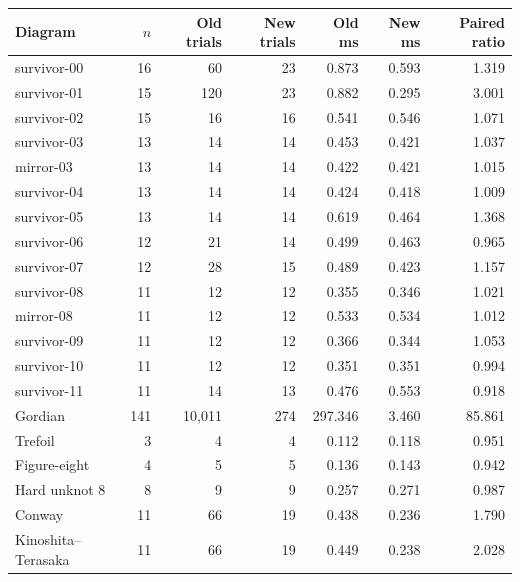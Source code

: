 \begingroup\small\setlength{\LTpre}{6pt}\setlength{\LTpost}{6pt}
\begin{longtable}{@{}lrrrrrr@{}}
\toprule Diagram & $n$ & Old trials & New trials & Old ms & New ms & Paired ratio\\\midrule\endhead
survivor-00 & 16 & 60 & 23 & 0.873 & 0.593 & 1.319\\
survivor-01 & 15 & 120 & 23 & 0.882 & 0.295 & 3.001\\
survivor-02 & 15 & 16 & 16 & 0.541 & 0.546 & 1.071\\
survivor-03 & 13 & 14 & 14 & 0.453 & 0.421 & 1.037\\
mirror-03 & 13 & 14 & 14 & 0.422 & 0.421 & 1.015\\
survivor-04 & 13 & 14 & 14 & 0.424 & 0.418 & 1.009\\
survivor-05 & 13 & 14 & 14 & 0.619 & 0.464 & 1.368\\
survivor-06 & 12 & 21 & 14 & 0.499 & 0.463 & 0.965\\
survivor-07 & 12 & 28 & 15 & 0.489 & 0.423 & 1.157\\
survivor-08 & 11 & 12 & 12 & 0.355 & 0.346 & 1.021\\
mirror-08 & 11 & 12 & 12 & 0.533 & 0.534 & 1.012\\
survivor-09 & 11 & 12 & 12 & 0.366 & 0.344 & 1.053\\
survivor-10 & 11 & 12 & 12 & 0.351 & 0.351 & 0.994\\
survivor-11 & 11 & 14 & 13 & 0.476 & 0.553 & 0.918\\
Gordian & 141 & 10,011 & 274 & 297.346 & 3.460 & 85.861\\
Trefoil & 3 & 4 & 4 & 0.112 & 0.118 & 0.951\\
Figure-eight & 4 & 5 & 5 & 0.136 & 0.143 & 0.942\\
Hard unknot 8 & 8 & 9 & 9 & 0.257 & 0.271 & 0.987\\
Conway & 11 & 66 & 19 & 0.438 & 0.236 & 1.790\\
Kinoshita--Terasaka & 11 & 66 & 19 & 0.449 & 0.238 & 2.028\\
\bottomrule\end{longtable}\endgroup
